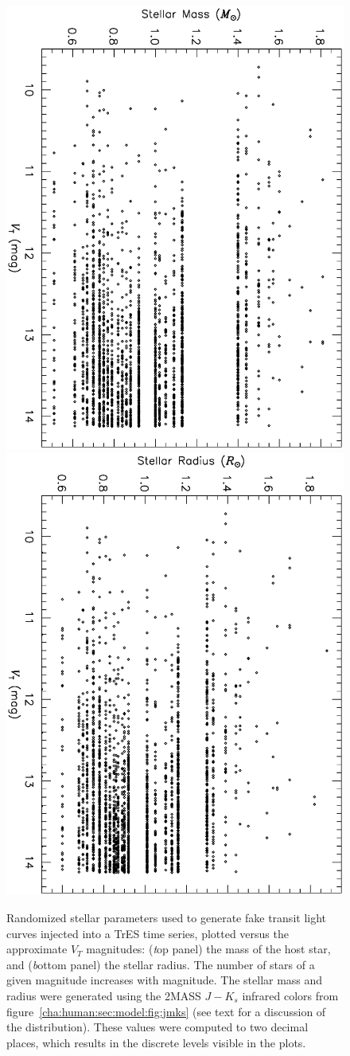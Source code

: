 \begin{figure}
\begin{center}
\centering
\includegraphics[width=.60\textwidth, angle=90]{7_phys_a}\\
\includegraphics[width=.60\textwidth, angle=90]{7_phys_b}\\
\caption[Randomized stellar parameters for injected transits]{%
Randomized stellar parameters used to generate fake transit light curves injected into a TrES time series, plotted versus the approximate $V_{T}$ magnitudes: %
({\textit top panel}) the mass of the host star, and %
({\textit bottom panel}) the stellar radius.
The number of stars of a given magnitude increases with magnitude.
The stellar mass and radius were generated using the 2MASS $J-K_{s}$ infrared colors from figure~\ref{cha:human:sec:model:fig:jmks} (see text for a discussion of the distribution).
These values were computed to two decimal places, which results in the discrete levels visible in the plots.%
}\label{cha:human:sec:model:fig:stel}
\end{center}
\end{figure}

